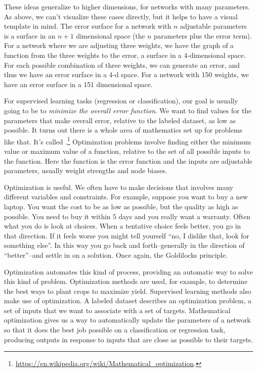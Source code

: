 These ideas generalize to higher dimensions, for networks with many parameters. As above, we can't visualize these cases directly, but it helps to have a visual template in mind. The error surface for a network with $n$ adjustable parameters is a surface in an $n+1$ dimensional space (the $n$ parameters plus the error term). For a network where we are adjusting three weights, we have the graph of a function from the three weights to the error, \ie a surface in a 4-dimensional space. For each possible combination of three weights, we can generate an error, and thus we have an error surface in a 4-d space. For a network with 150 weights, we have an error surface in a 151 dimensional space.

For supervised learning tasks (regression or classification), our goal is usually going to be to \emph{minimize the overall error function}. We want to find values for the parameters that make overall error, relative to the labeled dataset, as low as possible. It turns out there is a whole area of mathematics set up for problems like that. It's called .\footnote{\url{https://en.wikipedia.org/wiki/Mathematical_optimization}.} Optimization problems involve finding either the minimum value or maximum value of a function, relative to the set of all possible inputs to the function. Here the function is the error function and the inputs are adjustable parameters, usually weight strengths and node biases. 

Optimization is useful. We often have to make decisions that involves many different variables and constraints. For example, suppose you want to buy a new laptop. You want the cost to be as low as possible, but the quality as high as possible. You need to buy it within 5 days and you really want a warranty. Often what you do is look at choices. When a tentative choice feels  better, you go in that direction. If it feels worse  you might tell yourself  ``no, I dislike that, look for something else''. In this way you go back and forth--generally in the direction of ``better''--and settle in on a solution. Once again, the Goldilocks principle. 

Optimization automates this kind of process, providing an automatic way to solve this kind of problem. Optimization methods are used, for example, to determine the best ways to plant crops to maximize yield. Supervised learning methods also make use of optimization. A labeled dataset describes an optimization problem, a set of inputs that we want to associate with a set of targets. Mathematical optimization gives us a way to automatically update the parameters of a network so that it does the best job possible on a classification or regression task, producing outputs in response to inputs that are close as possible to their targets.

